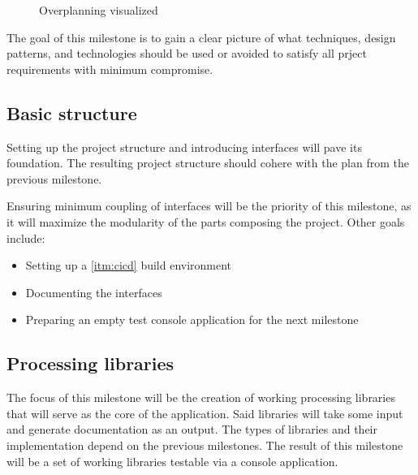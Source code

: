 \begin{figure}[H]
    \centering
    \caption{Overplanning visualized}
    \label{fig:overplanning}
\end{figure}

The goal of this milestone is to gain a clear picture of what techniques, design patterns, and technologies should be used or avoided to satisfy all prject requirements with minimum compromise.

\subsection*{Basic structure} \label{subSecBasicStructure}

Setting up the project structure and introducing interfaces will pave its foundation. The resulting project structure should cohere with the plan from the previous milestone.

Ensuring minimum coupling of interfaces will be the priority of this milestone, as it will maximize the modularity of the parts composing the project.
Other goals include:
\begin{itemize}
    \item Setting up a \ref{itm:cicd} build environment
    \item Documenting the interfaces
    \item Preparing an empty test console application for the next milestone
\end{itemize}

\subsection*{Processing libraries} \label{subSecProcessingLibs}

The focus of this milestone will be the creation of working processing libraries that will serve as the core of the application. Said libraries will take some input and generate documentation as an output. The types of libraries and their implementation depend on the previous milestones. The result of this milestone will be a set of working libraries testable via a console application.

